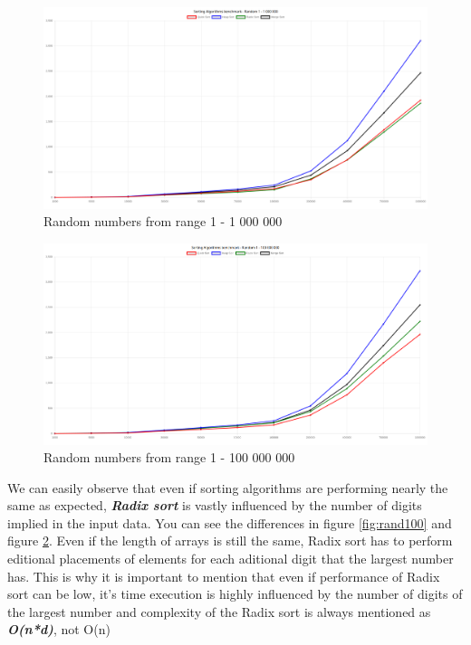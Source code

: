 \documentclass[12pt]{article}
\begin{document}
\begin{figure}[h]
    \centering
    \includegraphics[width=1\textwidth]{random10^6.png}
    \caption{Random numbers from range 1 - 1 000 000}
    \label{fig:rand1000000}
\end{figure}

\begin{figure}[h]
    \centering
    \includegraphics[width=1\textwidth]{random10^8.png}
    \caption{Random numbers from range 1 - 100 000 000}
    \label{fig:rand100000000}
\end{figure}

\clearpage
We can easily observe that even if sorting algorithms 
are performing nearly the same as expected, \textit{\textbf{Radix sort}} is vastly influenced 
by the number of digits implied in the input data. You can see the differences in
figure \ref{fig:rand100} and figure \ref{fig:rand100000000}. Even if the length of arrays is still the 
same, Radix sort has to perform editional placements of elements for each aditional digit that the
largest number has. This is why it is important to mention that even if performance of 
Radix sort can be low, it's time execution is highly influenced by the number of digits of the 
largest number and complexity of the Radix sort is always mentioned as \textit{\textbf{O(n*d)}}, not O(n)
\end{document}
